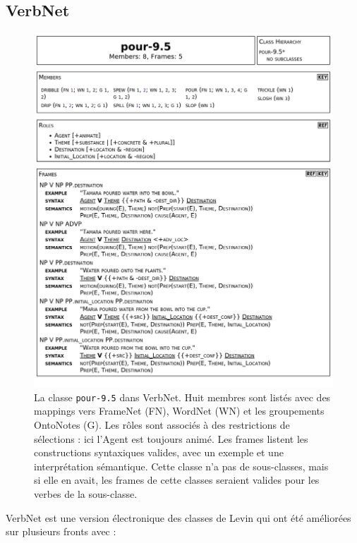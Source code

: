 \subsection{VerbNet}
\label{presentation_verbnet}

\begin{figure}[p]
    \centering
    \includegraphics[width=\textwidth]{fig/verbnet_pour_class.png}
    \caption{\label{fig:exemple_verbnet}La classe \texttt{pour-9.5} dans
    VerbNet. Huit membres sont listés avec des mappings vers FrameNet (FN),
    WordNet (WN) et les groupements OntoNotes (G). Les rôles sont associés à
    des restrictions de sélections : ici l'Agent est toujours animé. Les frames
    listent les constructions syntaxiques valides, avec un exemple et une
    interprétation sémantique. Cette classe n'a pas de sous-classes, mais si
    elle en avait, les frames de cette classes seraient valides pour les verbes
    de la sous-classe.}
\end{figure}

VerbNet \citep{kipperschuler2005verbnet} est une version électronique des
classes de Levin qui ont été améliorées sur plusieurs fronts avec :

